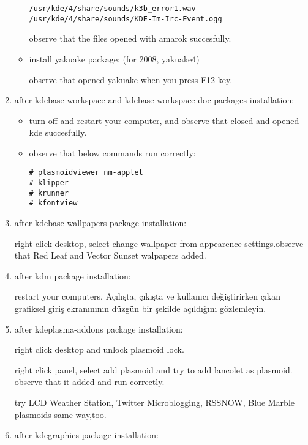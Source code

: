 \documentclass[a4paper,10pt]{article}
\begin{document}
\begin{enumerate}
\begin{itemize}
\begin{verbatim}
/usr/kde/4/share/sounds/k3b_error1.wav
/usr/kde/4/share/sounds/KDE-Im-Irc-Event.ogg
\end{verbatim}

observe that the files opened with amarok succesfully.

\item install yakuake package: (for 2008, yakuake4)

observe that opened yakuake when you press F12 key.
\end{itemize}
\item after kdebase-workspace and kdebase-workspace-doc packages installation:
\begin{itemize}

 \item turn off and restart your computer, and observe that closed and opened kde succesfully.

 \item observe that below commands run correctly:
\begin{verbatim}
# plasmoidviewer nm-applet 
# klipper
# krunner
# kfontview
\end{verbatim}

\end{itemize}

\item after kdebase-wallpapers package installation:

right click desktop, select change wallpaper from appearence settings.observe that Red Leaf and Vector Sunset walpapers added.

\item after kdm package installation:

restart your computers. Açılışta, çıkışta ve kullanıcı değiştirirken çıkan grafiksel giriş ekranınının düzgün bir şekilde açıldığını gözlemleyin.

\item after kdeplasma-addons package installation:

right click desktop and unlock plasmoid lock.

right click panel, select add plasmoid and try to add lancolet as plasmoid. observe that it added and run correctly.

try LCD Weather Station, Twitter Microblogging, RSSNOW, Blue Marble plasmoids same way,too.

\item after kdegraphics package installation:


\end{enumerate}
\end{document}
